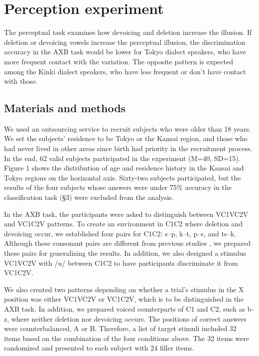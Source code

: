 \documentclass[a4paper,11pt,twocolumn]{article}
\begin{document}
\section{Perception experiment}

The perceptual task examines how devoicing and deletion increase the illusion. If deletion or devoicing vowels increase the perceptual illusion, the discrimination accuracy in the AXB task would be lower for Tokyo dialect speakers, who have more frequent contact with the variation. The opposite pattern is expected among the Kinki dialect speakers, who have less frequent or don’t have contact with those.

\subsection{Materials and methods}

We used an outsourcing service to recruit subjects who were older than 18 years. We set the subjects' residence to be Tokyo or the Kansai region, and those who had never lived in other areas since birth had priority in the recruitment process. In the end, 62 valid subjects participated in the experiment (M=40, SD=15). Figure 1 shows the distribution of age and residence history in the Kansai and Tokyo regions on the horizontal axis. Sixty-two subjects participated, but the results of the four subjects whose answers were under 75\% accuracy in the classification task (§3) were excluded from the analysis.

In the AXB task, the participants were asked to distinguish between VC1VC2V and VC1C2V patterns. To create an environment in C1C2 where deletion and devoicing occur, we established four pairs for C1C2: s--p, k--t, p--s, and ts--k. Although these consonant pairs are different from previous studies \cite{kilpatrick2018}, we prepared these pairs for generalizing the results. In addition, we also designed a stimulus VC1VC2V with /u/ between C1C2 to have participants discriminate it from VC1C2V.

We also created two patterns depending on whether a trial’s stimulus in the X position was either VC1VC2V or VC1C2V, which is to be distinguished in the AXB task. In addition, we prepared voiced counterparts of C1 and C2, such as b--z, where neither deletion nor devoicing occurs. The positions of correct answers were counterbalanced, A or B. Therefore, a list of target stimuli included 32 items based on the combination of the four conditions above. The 32 items were randomized and presented to each subject with 24 filler items.
\end{document}
